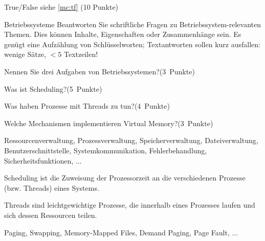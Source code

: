 \documentclass{exercisesheet}
\begin{document}
\begin{exercise}{True/False}
  siehe \ref{mc:tf} \hfill(10 Punkte)
\end{exercise}

\begin{eexercises}[14]{Betriebssysteme}{
    Beantworten Sie schriftliche Fragen zu Betriebssystem-relevanten Themen. Dies können Inhalte, Eigenschaften oder Zusammenhänge sein. Es genügt eine Aufzählung von Schlüsselworten; Textantworten sollen kurz ausfallen: wenige Sätze, $<5$ Textzeilen!
  }
  \item Nennen Sie drei Aufgaben von Betriebssystemen?\hfill(3~Punkte)
  \item Was ist Scheduling?\hfill(5~Punkte)
  \item Was haben Prozesse mit Threads zu tun?\hfill(4~Punkte)
  \item Welche Mechanismen implementieren Virtual Memory?\hfill(3~Punkte)
\end{eexercises}

\begin{solutions}
  \item Ressourcenverwaltung, Prozessverwaltung, Speicherverwaltung, Dateiverwaltung, Benutzerschnittstelle, Systemkommunikation, Fehlerbehandlung, Sicherheitsfunktionen, ...
  \item Scheduling ist die Zuweisung der Prozessorzeit an die verschiedenen Prozesse (bzw. Threads) eines Systems.
  \item Threads sind leichtgewichtige Prozesse, die innerhalb eines Prozesses laufen und sich dessen Ressourcen teilen.
  \item Paging, Swapping, Memory-Mapped Files, Demand Paging, Page Fault, ...
\end{solutions}
\end{document}

